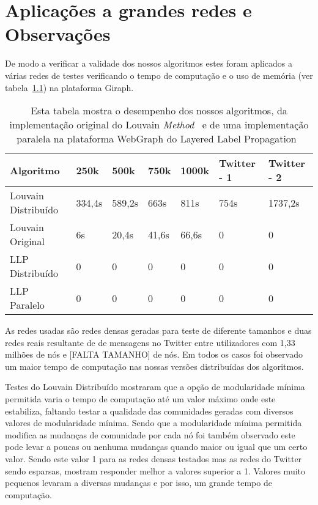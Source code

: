 \chapter{Aplicações a grandes redes e Observações}
De modo a verificar a validade dos nossos algoritmos estes foram aplicados a várias redes de testes verificando o tempo de computação e o uso de memória (ver tabela~\ref{tbl:tm}) na plataforma Giraph.
\begin{table}
	\centering
 \begin{tabular}{|l|l|l|l|l|l|l|}
 \hline
			Algoritmo & 250k & 500k & 750k & 1000k & Twitter - 1 & Twitter - 2\\ \hline
			Louvain Distribuído&334,4s&589,2s&663s&811s&754s&1737,2s\\ \hline
			Louvain Original&6s&20,4s&41,6s&66,6s&0&0\\ \hline
			LLP Distribuído& 0 & 0 &0 &0&0&0\\ \hline
			LLP Paralelo&0&0&0&0&0&0 \\ \hline
		\end{tabular}
		\caption{Esta tabela mostra o desempenho dos nossos algoritmos, da implementação original do Louvain \textit{Method}~\cite{orgLouvain} e de uma implementação paralela na plataforma WebGraph do Layered Label Propagation~\cite{prlLLP}}
		\label{tbl:tm}
\end{table}

 As redes usadas são redes densas geradas para teste de diferente tamanhos e duas redes reais resultante de de mensagens no Twitter entre utilizadores com 1,33 milhões de nós e [FALTA TAMANHO] de nós. Em todos os casos foi observado um maior tempo de computação nas nossas versões distribuídas dos algoritmos.

Testes do Louvain Distribuído mostraram que a opção de modularidade mínima permitida varia o tempo de computação até um valor máximo onde este estabiliza, faltando testar a qualidade das comunidades geradas com diversos valores de modularidade mínima. 
Sendo que a modularidade mínima permitida modifica as mudanças de comunidade por cada nó foi também observado este pode levar a poucas ou nenhuma mudanças quando maior ou igual que um certo valor. Sendo este valor 1 para as redes densas testados mas as redes do Twitter sendo esparsas, mostram responder melhor a valores superior a 1. Valores muito pequenos levaram a diversas mudanças e por isso, um grande tempo de computação.

